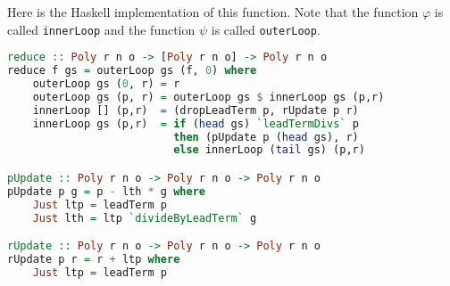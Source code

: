 \documentclass[MS, xcolor=dvipsnames]{wfuthesis}
\theoremstyle{definition}
\def\p{\varphi}
\begin{document}
Here is the Haskell implementation of this function. Note that the function $\p$ is called \lstinline{innerLoop} and the function $\psi$ is called \lstinline{outerLoop}.
\begin{lstlisting}[language=Haskell]
reduce :: Poly r n o -> [Poly r n o] -> Poly r n o
reduce f gs = outerLoop gs (f, 0) where
    outerLoop gs (0, r) = r
    outerLoop gs (p, r) = outerLoop gs $ innerLoop gs (p,r)
    innerLoop [] (p,r)  = (dropLeadTerm p, rUpdate p r)
    innerLoop gs (p,r)  = if (head gs) `leadTermDivs` p
                          then (pUpdate p (head gs), r)
                          else innerLoop (tail gs) (p,r)

pUpdate :: Poly r n o -> Poly r n o -> Poly r n o
pUpdate p g = p - lth * g where
    Just ltp = leadTerm p
    Just lth = ltp `divideByLeadTerm` g

rUpdate :: Poly r n o -> Poly r n o -> Poly r n o
rUpdate p r = r + ltp where
    Just ltp = leadTerm p
\end{lstlisting}

\end{document}
